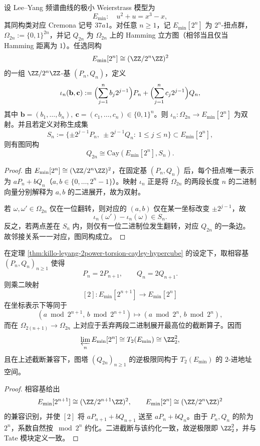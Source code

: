 \begin{theorem}\label{thm:killo-leyang-2power-torsion-cayley-hypercube}
设 Lee--Yang 频谱曲线的极小 Weierstrass 模型为
\[
E_{\min}:\quad u^2+u=x^3-x,
\]
其同构类对应 Cremona 记号 \(37a1\)。对任意 \(n\ge 1\)，记 \(E_{\min}[2^n]\) 为 \(2^n\)-扭点群，\(\Omega_{2n}:=\{0,1\}^{2n}\)，并记 \(Q_{2n}\) 为 \(\Omega_{2n}\) 上的 Hamming 立方图（相邻当且仅当 Hamming 距离为 \(1\)）。任选同构
\[
E_{\min}[2^n]\cong(\ZZ/2^n\ZZ)^2
\]
的一组 \(\ZZ/2^n\ZZ\)-基 \((P_n,Q_n)\)，定义
\[
\iota_n(\mathbf b,\mathbf c)
:=\Bigl(\sum_{j=1}^{n} b_j2^{j-1}\Bigr)P_n
 +\Bigl(\sum_{j=1}^{n} c_j2^{j-1}\Bigr)Q_n,
\]
其中 \(\mathbf b=(b_1,\dots,b_n),\ \mathbf c=(c_1,\dots,c_n)\in\{0,1\}^n\)。则 \(\iota_n:\Omega_{2n}\to E_{\min}[2^n]\) 为双射。并且若定义对称生成集
\[
S_n:=\{\pm 2^{j-1}P_n,\ \pm 2^{j-1}Q_n:\ 1\le j\le n\}\subset E_{\min}[2^n],
\]
则有图同构
\[
Q_{2n}\cong \mathrm{Cay}(E_{\min}[2^n],S_n).
\]
\end{theorem}
\begin{proof}
由 \(E_{\min}[2^n]\cong(\ZZ/2^n\ZZ)^2\)，在固定基 \((P_n,Q_n)\) 后，每个扭点唯一表示为 \(aP_n+bQ_n\)（\(a,b\in\{0,\dots,2^n-1\}\)）。映射 \(\iota_n\) 正是将 \(\Omega_{2n}\) 的两段长度 \(n\) 的二进制向量分别解释为 \(a,b\) 的二进展开，故为双射。

若 \(\omega,\omega'\in\Omega_{2n}\) 仅在一位翻转，则对应的 \((a,b)\) 仅在某一坐标改变 \(\pm 2^{j-1}\)，故
\[
\iota_n(\omega')-\iota_n(\omega)\in S_n.
\]
反之，若两点差在 \(S_n\) 内，则仅有一位二进制位发生翻转，对应 \(Q_{2n}\) 的一条边。故邻接关系一一对应，图同构成立。
\end{proof}

\begin{corollary}\label{cor:killo-2adic-tate-hypercube-limit}
在定理 \ref{thm:killo-leyang-2power-torsion-cayley-hypercube} 的设定下，取相容基 \((P_n,Q_n)_{n\ge 1}\) 使得
\[
P_n=2P_{n+1},\qquad Q_n=2Q_{n+1}.
\]
则乘二映射
\[
[2]:E_{\min}[2^{n+1}]\longrightarrow E_{\min}[2^n]
\]
在坐标表示下等同于
\[
(a\bmod 2^{n+1},\,b\bmod 2^{n+1})\longmapsto (a\bmod 2^n,\,b\bmod 2^n),
\]
而在 \(\Omega_{2(n+1)}\to\Omega_{2n}\) 上对应于丢弃两段二进制展开最高位的截断算子。因而
\[
\varprojlim_n E_{\min}[2^n]\cong T_2(E_{\min})\cong\ZZ_2^2,
\]
且在上述截断兼容下，图塔 \((Q_{2n})_{n\ge 1}\) 的逆极限同构于 \(T_2(E_{\min})\) 的 \(2\)-进地址空间。
\end{corollary}
\begin{proof}
相容基给出
\[
E_{\min}[2^{n+1}]\cong(\ZZ/2^{n+1}\ZZ)^2,\qquad
E_{\min}[2^n]\cong(\ZZ/2^n\ZZ)^2
\]
的兼容识别，并使 \([2]\) 将 \(aP_{n+1}+bQ_{n+1}\) 送至 \(aP_n+bQ_n\)。由于 \(P_n,Q_n\) 的阶为 \(2^n\)，系数自然按 \(\bmod 2^n\) 约化。二进截断与该约化一致，故逆极限即 \(\ZZ_2^2\)，并与 Tate 模块定义一致。
\end{proof}

